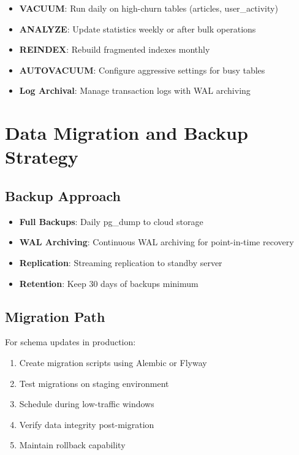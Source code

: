 \documentclass[12pt,a4paper]{report}
\begin{document}
\begin{itemize}
    \item \textbf{VACUUM}: Run daily on high-churn tables (articles, user\_activity)
    \item \textbf{ANALYZE}: Update statistics weekly or after bulk operations
    \item \textbf{REINDEX}: Rebuild fragmented indexes monthly
    \item \textbf{AUTOVACUUM}: Configure aggressive settings for busy tables
    \item \textbf{Log Archival}: Manage transaction logs with WAL archiving
\end{itemize}

\newpage

\chapter{Data Migration and Backup Strategy}

\section{Backup Approach}

\begin{itemize}
    \item \textbf{Full Backups}: Daily pg\_dump to cloud storage
    \item \textbf{WAL Archiving}: Continuous WAL archiving for point-in-time recovery
    \item \textbf{Replication}: Streaming replication to standby server
    \item \textbf{Retention}: Keep 30 days of backups minimum
\end{itemize}

\section{Migration Path}

For schema updates in production:

\begin{enumerate}
    \item Create migration scripts using Alembic or Flyway
    \item Test migrations on staging environment
    \item Schedule during low-traffic windows
    \item Verify data integrity post-migration
    \item Maintain rollback capability
\end{enumerate}
\end{document}
